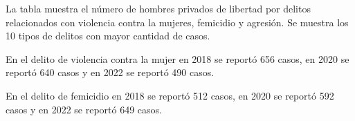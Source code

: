 La tabla muestra el número de hombres privados de libertad por delitos relacionados con violencia contra la mujeres, femicidio y agresión. Se muestra los 10 tipos de delitos con mayor cantidad de casos. 

En el delito de violencia contra la mujer en 2018 se reportó 656 casos, en 2020 se reportó 640 casos y en 2022 se reportó 490 casos. 

En el delito de femicidio en 2018 se reportó 512 casos, en 2020 se reportó 592 casos y en 2022 se reportó 649 casos. 
